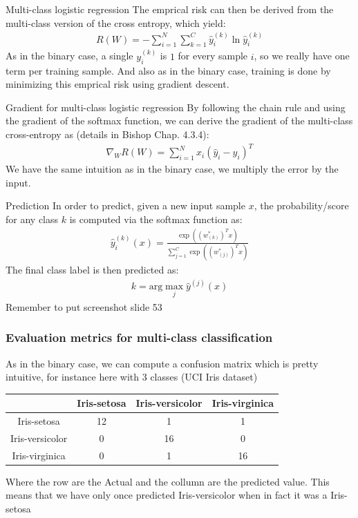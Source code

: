 	\begin{parag}{Multi-class logistic regression}
	    The emprical risk can then be derived from the multi-class version of the cross entropy, which yield:
		\begin{align*} 
			R\left(W\right) = -\sum_{i= 1}^{N}\sum_{k= 1}^{C}\hat{y}_i^{\left(k\right)}\ln\hat{y}_i^{\left(k\right)}
		\end{align*}
		As in the binary case, a single $y_i^{\left(k\right)}$ is $1$ for every sample $i$, so we really have one term per training sample. And also as in the binary case, training is done by minimizing this emprical risk using gradient descent.
	\end{parag}
	\begin{parag}{Gradient for multi-class logistic regression}
		By following the chain rule and using the gradient of the softmax function, we can derive the gradient of the multi-class cross-entropy as (details in Bishop Chap. 4.3.4):
		\begin{align*} 
			\nabla_W R\left(W\right) = \sum_{i = 1}^{N}x_i\left(\hat{y}_i - y_i\right)^{T}
		\end{align*}
	    We have the same intuition as in the binary case, we multiply the error by the input.
	\end{parag}
	\begin{parag}{Prediction}
	    In order to predict, given a new input sample $x$, the probability/score for any class $k$ is computed via the softmax function as:
		\begin{align*} 
			\hat{y}_i^{\left(k\right)}\left(x\right) = \frac{\exp\left(\left(w_{\left(k\right)}^{\ast}\right)^{T}x\right)}{\sum_{j= 1}^{C}\exp\left(\left(w_{\left(j\right)}^{\ast}\right)^{T}x\right)}
		\end{align*}
		The final class label is then predicted as:
		\begin{align*} 
			k =  \text{arg}\max_j \hat{y}^{\left(j\right)}\left(x\right)
		\end{align*}
		Remember to put screenshot slide 53
	\end{parag}

\subsubsection{Evaluation metrics for multi-class classification}
As in the binary case, we can compute a confusion matrix which is pretty intuitive, for instance here with 3 classes (UCI Iris dataset)
\begin{center}
\begin{tabular}{|c|c|c|c|}
	\hline
	& Iris-setosa & Iris-versicolor & Iris-virginica \\
	\hline
	Iris-setosa & 12 & 1 & 1 \\
	\hline
	Iris-versicolor & 0 & 16 & 0 \\
	\hline
	Iris-virginica & 0 & 1 & 16 \\
	\hline
\end{tabular}
\end{center}
Where the row are the Actual and the collumn are the predicted value. This means that we have only once predicted Iris-versicolor when in fact it was a Iris-setosa


